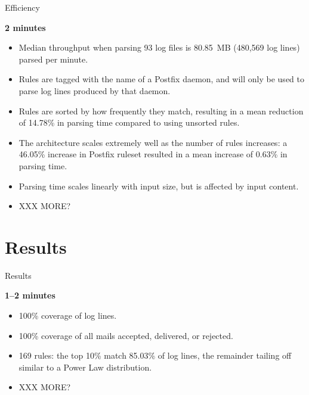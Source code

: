 \documentclass{beamer}
\newcommand{\timingnote}[1]{%
    \textbf{#1}%
}
\begin{document}
\begin{frame}{Efficiency}

    \timingnote{2 minutes}

    \begin{itemize}

        \item Median throughput when parsing 93 log files is 80.85~MB
            (480,569 log lines) parsed per minute.

        \item Rules are tagged with the name of a Postfix daemon, and will
            only be used to parse log lines produced by that daemon.

        \item Rules are sorted by how frequently they match, resulting in a
            mean reduction of 14.78\% in parsing time compared to using
            unsorted rules.

        \item The architecture scales extremely well as the number of rules
            increases: a 46.05\% increase in Postfix ruleset resulted in a
            mean increase of 0.63\% in parsing time.

        \item Parsing time scales linearly with input size, but is affected
            by input content.

        \item XXX MORE\@?

    \end{itemize}

\end{frame}

\section{Results}

\begin{frame}{Results}

    \timingnote{1--2 minutes}

    \begin{itemize}

        \item 100\% coverage of log lines.

        \item 100\% coverage of all mails accepted, delivered, or rejected.

        \item 169 rules: the top 10\% match 85.03\% of log lines, the
            remainder tailing off similar to a Power Law distribution.

        \item XXX MORE\@?

    \end{itemize}

\end{frame}
\end{document}
